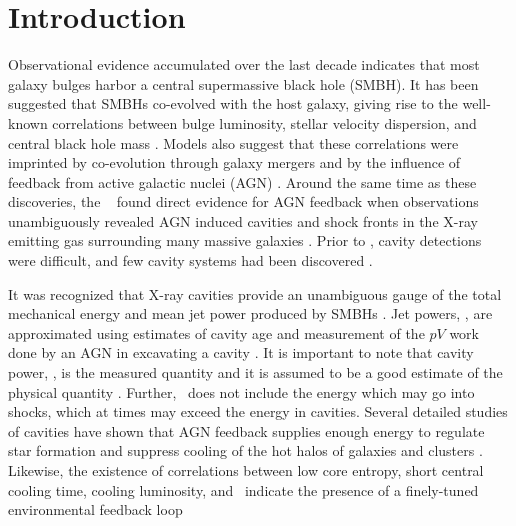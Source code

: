 \documentclass{emulateapj}
\begin{document}


\section{Introduction}
\label{sec:intro}

Observational evidence accumulated over the last decade indicates that
most galaxy bulges harbor a central supermassive black hole (SMBH).
It has been suggested that SMBHs co-evolved with the host galaxy,
giving rise to the well-known correlations between bulge luminosity,
stellar velocity dispersion, and central black hole mass
\citep{1995ARA&A..33..581K, magorrian, 2000ApJ...539L...9F,
  2000ApJ...539L..13G, marconihunt03, 2005MNRAS.362...25B}. Models
also suggest that these correlations were imprinted by co-evolution
through galaxy mergers and by the influence of feedback from active
galactic nuclei (AGN) \citep[\eg][]{1998A&A...331L...1S,
  2000MNRAS.311..576K}. Around the same time as these discoveries, the
\cxo\ \citep{chandra} found direct evidence for AGN feedback when
observations unambiguously revealed AGN induced cavities and shock
fronts in the X-ray emitting gas surrounding many massive galaxies
\citep[\eg][]{2000ApJ...534L.135M, perseus1, schindler01,
  2007ApJ...665.1057F, 2009ApJ...707.1034B}. Prior to \chandra, cavity
detections were difficult, and few cavity systems had been discovered
\citep{1981ApJ...248...47F, 1981ApJ...248...55B, perseus0,
  1994MNRAS.270..173C, 1998ApJ...493...73O, 1998ApJ...496..728H}.

It was recognized that X-ray cavities provide an unambiguous gauge of
the total mechanical energy and mean jet power produced by SMBHs
\citep{2000ApJ...534L.135M}. Jet powers, \pjet, are approximated using
estimates of cavity age and measurement of the $pV$ work done by an
AGN in excavating a cavity \citep[see][for reviews]{cfreview,
  mcnamrev}. It is important to note that cavity power, \pcav, is the
measured quantity and it is assumed to be a good estimate of the
physical quantity \pjet. Further, \pcav\ does not include the energy
which may go into shocks, which at times may exceed the energy in
cavities. Several detailed studies of cavities have shown that AGN
feedback supplies enough energy to regulate star formation and
suppress cooling of the hot halos of galaxies and clusters
\citep{birzan04, 2005MNRAS.364.1343D, rafferty06, dunn08, birzan08,
  2008ApJ...680..897D}. Likewise, the existence of correlations
between low core entropy, short central cooling time, cooling
luminosity, and \pjet\ indicate the presence of a finely-tuned
environmental feedback loop \citep[\ie][]{haradent,
  2008ApJ...687..899R, accept, 2009A&A...501..835M,
  2009MNRAS.395..764S}
\end{document}

